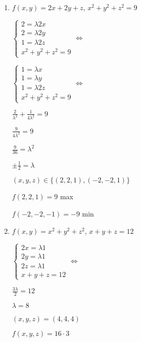 \documentclass[../practica_06.tex]{subfiles}
\begin{document}
\begin{enumerate}
        \item $f(x,y) = 2x + 2y + z$, $x^2+y^2+z^2=9$
        
            $\left \{\begin{array}{ll}
                2 = \lambda 2x \\
                2 = \lambda 2y \\
                1 = \lambda 2z \\
                x^2+y^2+z^2=9
            \end{array} 
            \right.\Leftrightarrow$

            $\left \{\begin{array}{ll}
                1 = \lambda x \\
                1 = \lambda y \\
                1 = \lambda 2z \\
                x^2+y^2+z^2=9
            \end{array} 
            \right.\Leftrightarrow$

            $\frac{2}{\lambda^2} + \frac{1}{4\lambda^2} = 9$

            $\frac{9}{4\lambda^2} = 9$

            $\frac{9}{36} = \lambda^2$

            $\pm \frac{1}{2} = \lambda$

            $(x,y,z) \in \{(2,2,1),(-2,-2,1)\}$

            $f(2,2,1) = 9$ max 

            $f(-2,-2,-1) = -9$ min

        \item $f(x,y) = x^2 + y^2 + z^2$, $x + y + z = 12$
        
            $\left \{\begin{array}{ll}
                2x = \lambda 1 \\
                2y = \lambda 1 \\
                2z = \lambda 1 \\
                x + y + z = 12
            \end{array} 
            \right.\Leftrightarrow$

            $\frac{3\lambda}{2} = 12$

            $\lambda = 8$

            $(x,y,z) = (4,4,4)$ 

            $f(x,y,z) = 16\cdot3$

    \end{enumerate}
\end{document}
